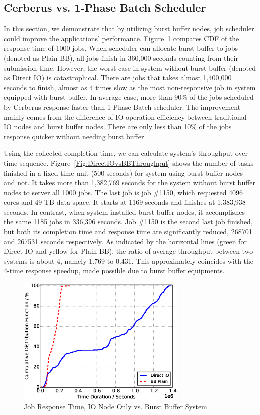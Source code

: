 \subsection{Cerberus vs. 1-Phase Batch Scheduler}
\label{Sec:Sim:DirectIOvsBB}
In this section, we demonstrate that by utilizing burst buffer nodes,
job scheduler could improve the applications' performance.
Figure~\ref{Fig:DirectIOvsBBResponse} compares CDF of the response time of 1000 jobs.
When scheduler can allocate burst buffer to jobs (denoted as Plain BB),
all jobs finish in 360,000 seconds counting from their submission time.
However, the worst case in system without burst buffer (denoted as Direct IO) is catastrophical.
There are jobs that takes almost 1,400,000 seconds to finish,
almost as 4 times slow as the most non-responsive job in system equipped with burst buffer.
In average case, more than 90\% of the jobs scheduled by Cerberus response faster than 1-Phase Batch scheduler.
The improvement mainly comes from the difference of IO operation efficiency between
traditional IO nodes and burst buffer nodes.
There are only less than 10\% of the jobs response quicker without needing burst buffer.

Using the collected completion time, we can calculate system's throughput over time sequence.
Figure~\ref{Fig:DirectIOvsBBThroughput} shows the number of tasks finished
in a fixed time unit (500 seconds) for system using burst buffer nodes and not.
It takes more than 1,382,769 seconds for the system without burst buffer nodes to
server all 1000 jobs.
The last job is job \#1150, which requested 4096 cores and 49 TB data space.
It starts at 1169 seconds and finishes at 1,383,938 seconds.
In contrast, when system installed burst buffer nodes,
it accomplishes the same 1185 jobs in 336,396 seconds.
Job \#1150 is the second last job finished, but both its completion time and response time
are significantly reduced, 268701 and 267531 seconds respectively.
As indicated by the horizontal lines (green for Direct IO and yellow for Plain BB),
the ratio of average throughput between two systems is about 4, namely 1.769 to 0.431.
This approximately coincides with the 4-time response speedup,
made possible due to burst buffer equipments.


\begin{figure}[!t]
        \centering
        \includegraphics[width=3.2in]{DrawDirectIOvsBB/1000jobs_direct_vs_bb_response}
        \caption{Job Response Time, IO Node Only vs. Burst Buffer System}
        \label{Fig:DirectIOvsBBResponse}
\end{figure}

